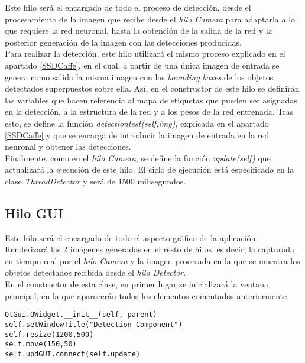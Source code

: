 \documentclass[a4paper, 12pt, spanish, chapterprefix, numbers=noenddot]{book}
\begin{document}
Este hilo será el encargado de todo el proceso de detección, desde el procesamiento de la imagen que recibe desde el \textit{hilo Camera} para adaptarla a lo que requiere la red neuronal, hasta la obtención de la salida de la red y la posterior generación de la imagen con las detecciones producidas.\\

Para realizar la detección, este hilo utilizará el mismo proceso explicado en el apartado \ref{SSDCaffe}, en el cual, a partir de una única imagen de entrada se genera como salida la misma imagen con las \textit{bounding boxes} de los objetos detectados superpuestos sobre ella. Así, en el constructor de este hilo se definirán las variables que hacen referencia al mapa de etiquetas que pueden ser asignadas en la detección, a la estructura de la red y a los pesos de la red entrenada. Tras esto, se define la función \textit{detectiontest(self,img)}, explicada en el apartado \ref{SSDCaffe} y que se encarga de introducir la imagen de entrada en la red neuronal y obtener las detecciones.\\

Finalmente, como en el \textit{hilo Camera}, se define la función \textit{update(self)} que actualizará la ejecución de este hilo. El ciclo de ejecución está especificado en la clase \textit{ThreadDetector} y será de 1500 milisegundos.

\subsection{Hilo GUI}

Este hilo será el encargado de todo el aspecto gráfico de la aplicación. Renderizará las 2 imágenes generadas en el resto de hilos, es decir, la capturada en tiempo real por el \textit{hilo Camera} y la imagen procesada en la que se muestra los objetos detectados recibida desde el \textit{hilo Detector}.\\

En el constructor de esta clase, en primer lugar se inicializará la ventana principal, en la que aparecerán todos los elementos comentados anteriormente.\\

\begin{lstlisting}[frame=single]
QtGui.QWidget.__init__(self, parent)
self.setWindowTitle("Detection Component")
self.resize(1200,500)
self.move(150,50)
self.updGUI.connect(self.update)
\end{lstlisting}
\end{document}
